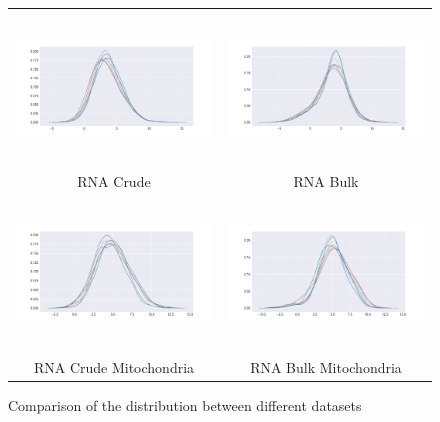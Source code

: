 \begin{figure}[H]
	\renewcommand{\arraystretch}{0.5}
	\centering
	\begin{tabular}{cc}
		\includegraphics[width=75mm,height=40mm]{Figures/exploratory/kde_RNACru.png}&
		\includegraphics[width=75mm,height=40mm]{Figures/exploratory/kde_RNATot.png} \\
		RNA Crude & RNA Bulk \\
		\includegraphics[width=75mm,height=40mm]{Figures/exploratory/kde_RNACruMito.png} &
		\includegraphics[width=75mm,height=40mm]{Figures/exploratory/kde_RNATotMito.png} \\
		RNA Crude Mitochondria & RNA Bulk Mitochondria
	\end{tabular}
\label{fig: KDE}
\caption{Comparison of the distribution between different datasets}
\end{figure}

